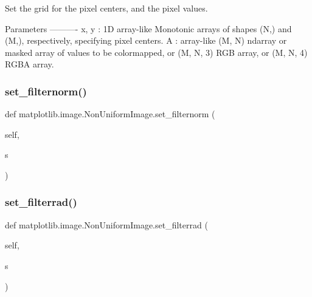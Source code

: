 \begin{DoxyVerb}Set the grid for the pixel centers, and the pixel values.

Parameters
----------
x, y : 1D array-like
    Monotonic arrays of shapes (N,) and (M,), respectively, specifying
    pixel centers.
A : array-like
    (M, N) ndarray or masked array of values to be colormapped, or
    (M, N, 3) RGB array, or (M, N, 4) RGBA array.
\end{DoxyVerb}
 \mbox{\label{classmatplotlib_1_1image_1_1NonUniformImage_a6e1e006491f0f280c8d6fee51d997a3e}} 
\subsubsection{\texorpdfstring{set\+\_\+filternorm()}{set\_filternorm()}}
{\footnotesize\ttfamily def matplotlib.\+image.\+Non\+Uniform\+Image.\+set\+\_\+filternorm (\begin{DoxyParamCaption}\item[{}]{self,  }\item[{}]{s }\end{DoxyParamCaption})}

\mbox{\label{classmatplotlib_1_1image_1_1NonUniformImage_a1fa840053b2ed1725b0bc1be2466a842}} 
\subsubsection{\texorpdfstring{set\+\_\+filterrad()}{set\_filterrad()}}
{\footnotesize\ttfamily def matplotlib.\+image.\+Non\+Uniform\+Image.\+set\+\_\+filterrad (\begin{DoxyParamCaption}\item[{}]{self,  }\item[{}]{s }\end{DoxyParamCaption})}

